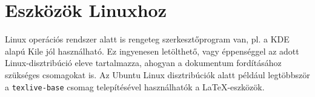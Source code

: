 \section{Eszközök Linuxhoz}
Linux operációs rendszer alatt is rengeteg szerkesztőprogram van, pl. a KDE alapú Kile jól használható. Ez ingyenesen letölthető, vagy éppenséggel az adott Linux-disztribúció eleve tartalmazza, ahogyan a dokumentum fordításához szükséges csomagokat is. Az Ubuntu Linux disztribúciók alatt például legtöbbször a \texttt{texlive-base} csomag telepítésével használhatók a \LaTeX-eszközök.
